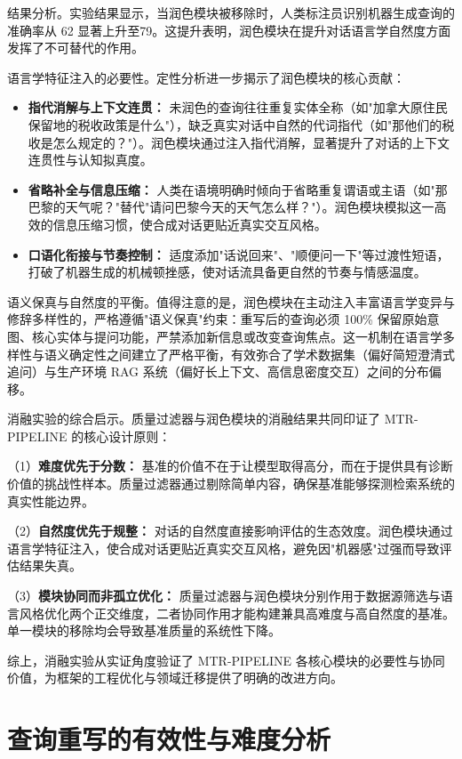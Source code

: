 结果分析。实验结果显示，当润色模块被移除时，人类标注员识别机器生成查询的准确率从 62 显著上升至79。这提升表明，润色模块在提升对话语言学自然度方面发挥了不可替代的作用。

语言学特征注入的必要性。定性分析进一步揭示了润色模块的核心贡献：
\begin{itemize}
    \item \textbf{指代消解与上下文连贯：} 未润色的查询往往重复实体全称（如"加拿大原住民保留地的税收政策是什么"），缺乏真实对话中自然的代词指代（如"那他们的税收是怎么规定的？"）。润色模块通过注入指代消解，显著提升了对话的上下文连贯性与认知拟真度。
    \item \textbf{省略补全与信息压缩：} 人类在语境明确时倾向于省略重复谓语或主语（如"那巴黎的天气呢？"替代"请问巴黎今天的天气怎么样？"）。润色模块模拟这一高效的信息压缩习惯，使合成对话更贴近真实交互风格。
    \item \textbf{口语化衔接与节奏控制：} 适度添加"话说回来"、"顺便问一下"等过渡性短语，打破了机器生成的机械顿挫感，使对话流具备更自然的节奏与情感温度。
\end{itemize}

语义保真与自然度的平衡。值得注意的是，润色模块在主动注入丰富语言学变异与修辞多样性的，严格遵循"语义保真"约束：重写后的查询必须 100\% 保留原始意图、核心实体与提问功能，严禁添加新信息或改变查询焦点。这一机制在语言学多样性与语义确定性之间建立了严格平衡，有效弥合了学术数据集（偏好简短澄清式追问）与生产环境 RAG 系统（偏好长上下文、高信息密度交互）之间的分布偏移。

消融实验的综合启示。质量过滤器与润色模块的消融结果共同印证了 MTR-PIPELINE 的核心设计原则：

（1）\textbf{难度优先于分数：} 基准的价值不在于让模型取得高分，而在于提供具有诊断价值的挑战性样本。质量过滤器通过剔除简单内容，确保基准能够探测检索系统的真实性能边界。

（2）\textbf{自然度优先于规整：} 对话的自然度直接影响评估的生态效度。润色模块通过语言学特征注入，使合成对话更贴近真实交互风格，避免因"机器感"过强而导致评估结果失真。

（3）\textbf{模块协同而非孤立优化：} 质量过滤器与润色模块分别作用于数据源筛选与语言风格优化两个正交维度，二者协同作用才能构建兼具高难度与高自然度的基准。单一模块的移除均会导致基准质量的系统性下降。


综上，消融实验从实证角度验证了 MTR-PIPELINE 各核心模块的必要性与协同价值，为框架的工程优化与领域迁移提供了明确的改进方向。


\section{查询重写的有效性与难度分析}
\label{sec:query_rewriting_analysis}

